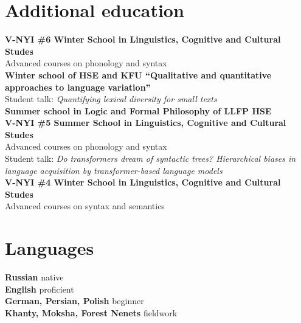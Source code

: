 \documentclass[11pt]{article} %
\begin{document}
\section*{Additional education}
 \textbf{V-NYI \#6 Winter School in Linguistics, Cognitive and Cultural Studes}\\
{Advanced courses on phonology and syntax}\\
 \textbf{Winter school of HSE and KFU ``Qualitative and quantitative approaches to language variation''}\\
{Student talk: \emph{Quantifying lexical diversity for small texts}}\\
 \textbf{Summer school in Logic and Formal Philosophy of LLFP HSE}\\
 \textbf{V-NYI \#5 Summer School in Linguistics, Cognitive and Cultural Studes}\\
{Advanced courses on phonology and syntax}\\
{Student talk: \emph{Do transformers dream of syntactic trees? Hierarchical biases in language acquisition by transformer-based language models}}\\
 \textbf{V-NYI \#4 Winter School in Linguistics, Cognitive and Cultural Studes}\\
{Advanced courses on syntax and semantics}\\

\section*{Languages}

\textbf{Russian} native\\
\textbf{English} proficient\\
\textbf{German, Persian, Polish} beginner\\
\textbf{Khanty, Moksha, Forest Nenets} fieldwork




\end{document}
